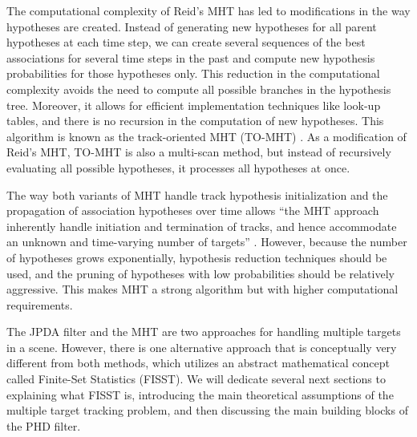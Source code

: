 The computational complexity of Reid's MHT has led to modifications in the way hypotheses are created. Instead of generating new hypotheses for all parent hypotheses at each time step, we can create several sequences of the best associations for several time steps in the past and compute new hypothesis probabilities for those hypotheses only. This reduction in the computational complexity avoids the need to compute all possible branches in the hypothesis tree. Moreover, it allows for efficient implementation techniques like look-up tables, and there is no recursion in the computation of new hypotheses. This algorithm is known as the track-oriented MHT (TO-MHT) \cite{werthmannStepbystepDescriptionComputationally1992}. As a modification of Reid's MHT, TO-MHT is also a multi-scan method, but instead of recursively evaluating all possible hypotheses, it processes all hypotheses at once.

The way both variants of MHT handle track hypothesis initialization and the propagation of association hypotheses over time allows ``the MHT approach inherently handle initiation and termination of tracks, and hence accommodate an unknown and time-varying number of targets'' \cite{voMultitargetTracking2015}. However, because the number of hypotheses grows exponentially, hypothesis reduction techniques should be used, and the pruning of hypotheses with low probabilities should be relatively aggressive. This makes MHT a strong algorithm but with higher computational requirements.

The JPDA filter and the MHT are two approaches for handling multiple targets in a scene. However, there is one alternative approach that is conceptually very different from both methods, which utilizes an abstract mathematical concept called Finite-Set Statistics (FISST). We will dedicate several next sections to explaining what FISST is, introducing the main theoretical assumptions of the multiple target tracking problem, and then discussing the main building blocks of the PHD filter.

